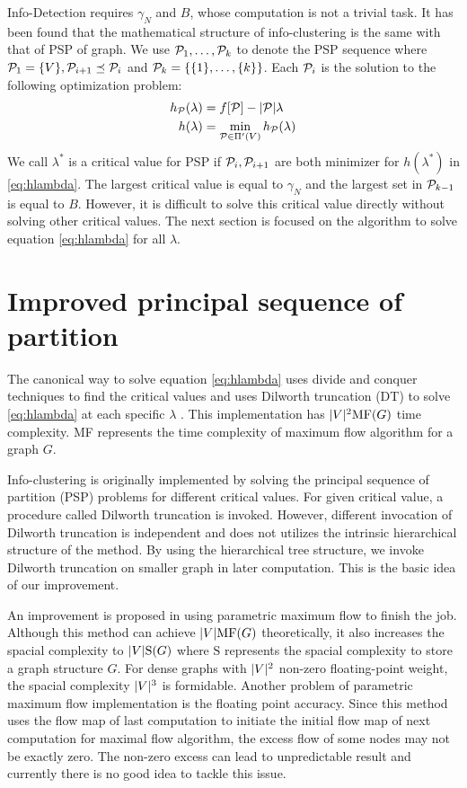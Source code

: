\documentclass[runningheads]{llncs}
\begin{document}
Info-Detection requires $\gamma_N$ and $B$, whose computation is not a trivial task. It has been found that the mathematical structure of info-clustering is the same with that of PSP of graph. We use $\P_1, \dots, \P_k$ to denote the PSP sequence where $\P_1 = \{V\}, \P_{i+1} \preceq \P_i$ and $\P_k = \{\{1\},\dots,\{k\}\}$.
Each $\P_i$ is the solution to the following optimization problem:
\begin{align}
h_{\P}(\lambda) &=  f[\P] - \abs{\P} \lambda  \label{eq:hPL}\\
h(\lambda) &= \min_{\P \in \Pi'(V)} h_{\P}(\lambda) \label{eq:hlambda}
\end{align}
We call $\lambda^*$ is a critical value for PSP if $\P_i, \P_{i+1}$ are both minimizer for $h(\lambda^*)$ in \eqref{eq:hlambda}.
The largest critical value is equal to $\gamma_N$ and the largest set in $\P_{k-1}$ is equal to $B$. However, it is difficult to solve this critical value directly without solving other critical values. The next section is focused on the algorithm to solve equation \eqref{eq:hlambda} for all $\lambda$.

\section{Improved principal sequence of partition}\label{sec:Alg}
The canonical way to solve equation \eqref{eq:hlambda} uses divide and conquer techniques to find the critical values and uses Dilworth truncation (DT) to solve \eqref{eq:hlambda} at each specific $\lambda$ \cite{RN7}.  This implementation has $\abs{V}^2 \textrm{MF}(G)$ time complexity. \textrm{MF} represents the time complexity of maximum flow algorithm for a graph $G$. 

Info-clustering is originally implemented by solving the principal sequence of partition (PSP) problems for different critical values. For given critical value, a procedure called Dilworth truncation is invoked. However, different invocation of Dilworth truncation is independent and does not utilizes the intrinsic hierarchical structure of the method. By using the hierarchical tree structure, we invoke Dilworth truncation on smaller graph in later computation. This is the basic idea of our improvement. 

An improvement is proposed in \cite{RN4} using parametric maximum flow to finish the job. Although this method can achieve $\abs{V} \textrm{MF}(G)$ theoretically, it also increases the spacial complexity to $ \abs{V} \textrm{S}(G)$ where $\textrm{S}$ represents the spacial complexity to store a graph structure $G$. For dense graphs with $\abs{V}^2$ non-zero floating-point weight, the spacial complexity $\abs{V}^3$ is formidable. 
Another problem of parametric maximum flow implementation is the floating point accuracy. Since this method uses the flow map of last computation to initiate the initial flow map of next computation for maximal flow algorithm, the excess flow of some nodes may not be exactly zero. The non-zero excess can lead to unpredictable result and currently there is no good idea to tackle this issue. 
\end{document}
